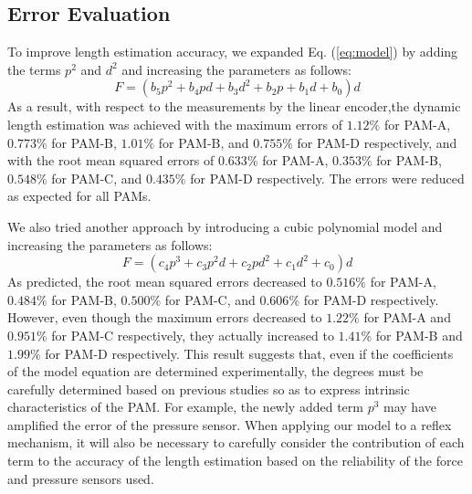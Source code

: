\subsection{Error Evaluation}
To improve length estimation accuracy, we expanded Eq. (\ref{eq:model}) by adding the terms $p^2$ and $d^2$ and increasing the parameters as follows:
\begin{equation}
\label{eq:model_2d(1)}
F = (b_5p^2 + b_4pd + b_3d^2 + b_2p+b_1d+b_0)d
\end{equation}
As a result, with respect to the measurements by the linear encoder,the dynamic length estimation was achieved with the maximum errors of $1.12\%$ for PAM-A, $0.773\%$ for PAM-B, $1.01\%$ for PAM-B, and $0.755\%$ for PAM-D respectively, and with the root mean squared errors of $0.633\%$ for PAM-A, $0.353\%$ for PAM-B, $0.548\%$ for PAM-C, and $0.435\%$ for PAM-D respectively. The errors were reduced as expected for all PAMs. 


We also tried another approach by introducing a cubic polynomial model and increasing the parameters as follows:
\begin{equation}
    \label{eq:model_3d}
    F = (c_4p^3+c_3p^2d+c_2pd^2+c_1d^2+c_0)d
\end{equation}
As predicted, the root mean squared errors decreased to $0.516\%$ for PAM-A, $0.484\%$ for PAM-B, $0.500\%$ for PAM-C, and $0.606\%$ for PAM-D respectively. 
However, even though the maximum errors decreased to $1.22\%$ for PAM-A and $0.951\%$ for PAM-C respectively, they actually increased to $1.41\%$ for PAM-B and $1.99\%$ for PAM-D respectively. This result suggests that, even if the coefficients of the model equation are determined experimentally, the degrees must be carefully determined based on previous studies so as to express intrinsic characteristics of the PAM. For example, the newly added term $p^3$ may have amplified the error of the pressure sensor. When applying our model to a reflex mechanism, it will also be necessary to carefully consider the contribution of each term to the accuracy of the length estimation based on the reliability of the force and pressure sensors used.

